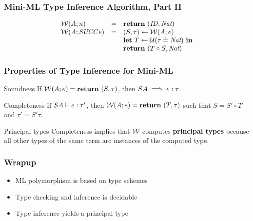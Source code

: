 \documentclass[pdftex,aspectratio=169]{beamer}
\begin{document}
\begin{frame}
  \frametitle{Mini-ML Type Inference Algorithm, Part II}
 \begin{displaymath}
   \begin{array}{lcl}
      \calW (\Tenv ;  n) &=&
      \mathbf{return}\ (\mathit{ID}, \Nat) \\
      \calW (\Tenv ; \Succ e) &=&
      (S, \tau) \gets \calW (\Tenv ; e) \\
      &&\mathbf{let}\ T \gets \calU (\tau\doteq\Nat)\ \mathbf{in} \\
      &&\mathbf{return}\ (T \circ S, \Nat)
   \end{array}
 \end{displaymath}
\end{frame}


\begin{frame}
  \frametitle{Properties of Type Inference for Mini-ML}
  \begin{block}{Soundness}
    If $\mathcal{W} (A; e) = \mathbf{return}\ (S, \tau)$, then $SA \implies e : \tau$.
  \end{block}
  \begin{block}{Completeness}
    If $SA \vdash e : \tau'$, then $\mathcal{W} (A ; e) =
    \mathbf{return}\ (T, \tau)$ such that $S = S'\circ T$ and $\tau'= S'\tau$.
  \end{block}
  \begin{block}{Principal types}
    Completeness implies that $\mathcal{W}$ computes \textbf{principal types} because all other types of the same term are instances of the computed type.
  \end{block}
\end{frame}


\begin{frame}
  \frametitle{Wrapup}
  \begin{itemize}
  \item ML polymorphism is based on type schemes
  \item Type checking and inference is decidable
  \item Type inference yields a principal type
  \end{itemize}
\end{frame}
\end{document}
